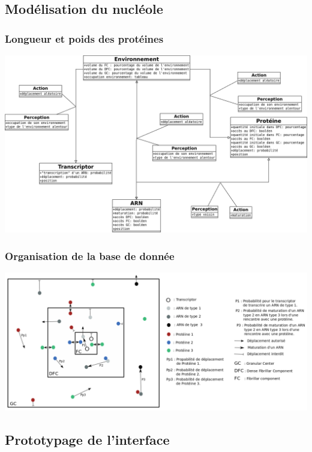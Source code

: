 \documentclass{beamer}
\begin{document}
\subsection{Modélisation du nucléole}

\begin{frame}
  \frametitle{Longueur et poids des protéines}

  \begin{block}{}
  \begin{center}
    \includegraphics[width=1\columnwidth]{img/diagSMA.png}
  \end{center}
  \end{block}

\end{frame}

\begin{frame}
  \frametitle{Organisation de la base de donnée}

  \begin{center}
    \includegraphics[width=1\columnwidth]{img/schemaSimu.pdf}
  \end{center}

\end{frame}

\subsection{Prototypage de l'interface}
\end{document}
